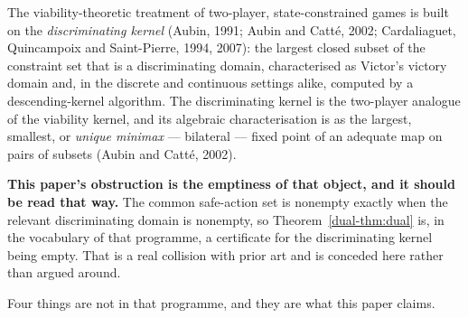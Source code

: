 \documentclass[10pt,twocolumn]{article}
\theoremstyle{plain}
\theoremstyle{definition}
\theoremstyle{remark}
\begin{document}
The viability-theoretic treatment of two-player, state-constrained games is built on the
\emph{discriminating kernel} (Aubin, 1991; Aubin and Catt\'e, 2002; Cardaliaguet, Quincampoix
and Saint-Pierre, 1994, 2007): the largest closed subset of the constraint set that is a
discriminating domain, characterised as Victor's victory domain and, in the discrete and
continuous settings alike, computed by a descending-kernel algorithm. The discriminating
kernel is the two-player analogue of the viability kernel, and its algebraic characterisation
is as the largest, smallest, or \emph{unique minimax} --- bilateral --- fixed point of an
adequate map on pairs of subsets (Aubin and Catt\'e, 2002).

\textbf{This paper's obstruction is the emptiness of that object, and it should be read that
way.} The common safe-action set is nonempty exactly when the relevant discriminating domain
is nonempty, so Theorem~\ref{dual-thm:dual} is, in the vocabulary of that programme, a
certificate for the discriminating kernel being empty. That is a real collision with prior
art and is conceded here rather than argued around.

Four things are not in that programme, and they are what this paper claims.
\end{document}
